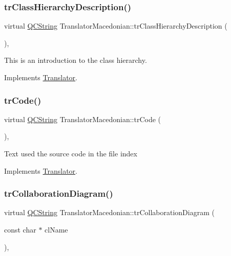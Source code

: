 \subsubsection{\texorpdfstring{trClassHierarchyDescription()}{trClassHierarchyDescription()}}
{\footnotesize\ttfamily virtual \mbox{\hyperlink{class_q_c_string}{Q\+C\+String}} Translator\+Macedonian\+::tr\+Class\+Hierarchy\+Description (\begin{DoxyParamCaption}{ }\end{DoxyParamCaption})\hspace{0.3cm}{\ttfamily [inline]}, {\ttfamily [virtual]}}

This is an introduction to the class hierarchy. 

Implements \mbox{\hyperlink{class_translator}{Translator}}.

\mbox{\label{class_translator_macedonian_a6cc821aa6b12f0945dfdee13beef1733}} 
\subsubsection{\texorpdfstring{trCode()}{trCode()}}
{\footnotesize\ttfamily virtual \mbox{\hyperlink{class_q_c_string}{Q\+C\+String}} Translator\+Macedonian\+::tr\+Code (\begin{DoxyParamCaption}{ }\end{DoxyParamCaption})\hspace{0.3cm}{\ttfamily [inline]}, {\ttfamily [virtual]}}

Text used the source code in the file index 

Implements \mbox{\hyperlink{class_translator}{Translator}}.

\mbox{\label{class_translator_macedonian_a521a72215c725a89a59ed2ebc2084f04}} 
\subsubsection{\texorpdfstring{trCollaborationDiagram()}{trCollaborationDiagram()}}
{\footnotesize\ttfamily virtual \mbox{\hyperlink{class_q_c_string}{Q\+C\+String}} Translator\+Macedonian\+::tr\+Collaboration\+Diagram (\begin{DoxyParamCaption}\item[{const char $\ast$}]{cl\+Name }\end{DoxyParamCaption})\hspace{0.3cm}{\ttfamily [inline]}, {\ttfamily [virtual]}}

